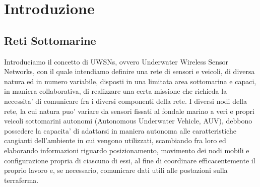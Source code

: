 \chapter{Introduzione}

\section{Reti Sottomarine}
Introduciamo il concetto di UWSNs, ovvero Underwater Wireless  Sensor Networks, con il quale intendiamo definire una rete di sensori e veicoli, di diversa natura ed in numero variabile, disposti in una limitata area sottomarina e capaci, in maniera collaborativa, di realizzare una certa missione che richieda la necessita' di comunicare fra i diversi componenti della rete.\newline
I diversi nodi della rete, la cui natura puo' variare da sensori fissati al fondale marino a veri e propri veicoli sottomarini autonomi (Autonomous Underwater Vehicle, AUV), debbono possedere la capacita' di adattarsi in maniera autonoma alle caratteristiche cangianti dell'ambiente in cui vengono utilizzati, scambiando fra loro ed elaborando informazioni riguardo posizionamento, movimento dei nodi mobili e configurazione propria di ciascuno di essi, al fine di coordinare efficacentemente il proprio lavoro e, se necessario, comunicare dati utili alle postazioni sulla terraferma.

